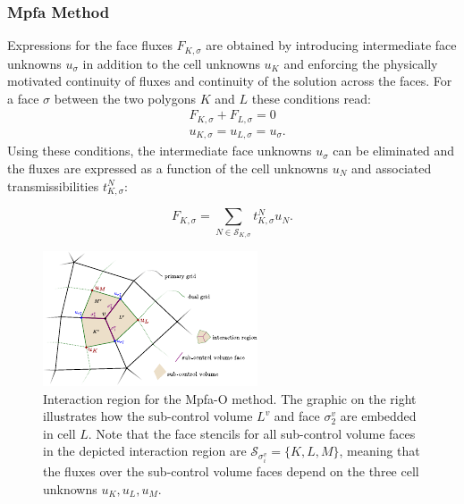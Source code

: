 \subsubsection{Mpfa Method}\label{cc_mpfa}
Expressions for the face fluxes $F_{K, \sigma}$ are obtained by introducing intermediate face unknowns $u_\sigma$ in addition to the cell unknowns $u_K$ and enforcing the physically motivated continuity of fluxes and continuity of the solution across the faces. For a face $\sigma$ between the two polygons $K$ and $L$ these conditions read:
\begin{equation}
    \begin{aligned}
        &F_{K, \sigma} + F_{L, \sigma} = 0 \\
        &{u}_{K,\sigma} = {u}_{L,\sigma} = {u}_{\sigma}.
        \label{eq:sigmaConditions}
    \end{aligned}
\end{equation}
Using these conditions, the intermediate face unknowns ${u}_\sigma$ can be eliminated and the fluxes are expressed as a function of the cell unknowns $u_N$ and associated transmissibilities $t^N_{K,\sigma}$:

\begin{equation}
    F_{K,\sigma} = \sum_{N \in \mathcal{S}_{K,\sigma}} t^N_{K,\sigma} u_{N}.
    \label{eq:FVFluxExpression}
\end{equation}

\begin{figure} [ht]
\centering
\includegraphics[width=0.8\linewidth,keepaspectratio]{pdf/mpfa_iv.pdf}
\caption{Interaction region for the Mpfa-O method. The graphic on the right illustrates how the sub-control volume $L^v$ and face $\sigma^v_2$ are embedded in cell $L$. Note that the face stencils for all sub-control volume faces in the depicted interaction region are $\mathcal{S}_{\sigma^v_i} = \{ K,L,M \}$, meaning that the fluxes over the sub-control volume faces depend on the three cell unknowns $u_K, u_L, u_M$.}
\label{pc:interactionRegion_mpfa}
\end{figure}

